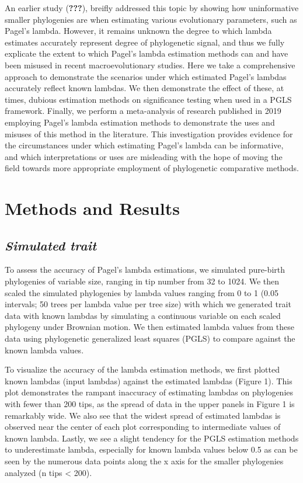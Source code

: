 \documentclass[
]{article}
\begin{document}
An earlier study ({\textbf{???}}), breifly addressed this topic by
showing how uninformative smaller phylogenies are when estimating
various evolutionary parameters, such as Pagel's lambda. However, it
remains unknown the degree to which lambda estimates accurately
represent degree of phylogenetic signal, and thus we fully explicate the
extent to which Pagel's lambda estimation methods can and have been
misused in recent macroevolutionary studies. Here we take a
comprehensive approach to demonstrate the scenarios under which
estimated Pagel's lambdas accurately reflect known lambdas. We then
demonstrate the effect of these, at times, dubious estimation methods on
significance testing when used in a PGLS framework. Finally, we perform
a meta-analysis of research published in 2019 employing Pagel's lambda
estimation methods to demonstrate the uses and misuses of this method in
the literature. This investigation provides evidence for the
circumstances under which estimating Pagel's lambda can be informative,
and which interpretations or uses are misleading with the hope of moving
the field towards more appropriate employment of phylogenetic
comparative methods.

\hypertarget{methods-and-results}{%
\section{Methods and Results}\label{methods-and-results}}

\hypertarget{simulated-trait}{%
\subsection{\texorpdfstring{\emph{Simulated
trait}}{Simulated trait}}\label{simulated-trait}}

To assess the accuracy of Pagel's lambda estimations, we simulated
pure-birth phylogenies of variable size, ranging in tip number from 32
to 1024. We then scaled the simulated phylogenies by lambda values
ranging from 0 to 1 (0.05 intervals; 50 trees per lambda value per tree
size) with which we generated trait data with known lambdas by
simulating a continuous variable on each scaled phylogeny under Brownian
motion. We then estimated lambda values from these data using
phylogenetic generalized least squares (PGLS) to compare against the
known lambda values. \hfill\break

To visualize the accuracy of the lambda estimation methods, we first
plotted known lambdas (input lambdas) against the estimated lambdas
(Figure 1). This plot demonstrates the rampant inaccuracy of estimating
lambdas on phylogenies with fewer than 200 tips, as the spread of data
in the upper panels in Figure 1 is remarkably wide. We also see that the
widest spread of estimated lambdas is observed near the center of each
plot corresponding to intermediate values of known lambda. Lastly, we
see a slight tendency for the PGLS estimation methods to underestimate
lambda, especially for known lambda values below 0.5 as can be seen by
the numerous data points along the x axis for the smaller phylogenies
analyzed (n tips \textless{} 200). \hfill\break
\end{document}
